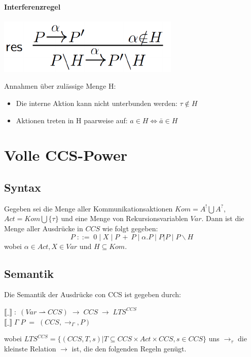 \documentclass[a4paper,10pt, oneside]{book}
\begin{document}
\paragraph{Interferenzregel}
\begin{center}
 \includegraphics[scale=0.6]{res_regel}
\end{center}

Annahmen über zulässige Menge H:
\begin{itemize}
 \item Die interne Aktion kann nicht unterbunden werden: $\tau \notin H$
 \item Aktionen treten in H paarweise auf: $a \in H \Longleftrightarrow \bar{a} \in H$
\end{itemize}

\section{Volle CCS-Power}
\subsection{Syntax}
Gegeben sei die Menge aller Kommunikationsaktionen $Kom = A^! \bigcup A^?$, $Act = Kom \bigcup \{ \tau \}$ und eine Menge von Rekursionsvariablen $Var$. Dann ist die Menge aller Ausdrücke in $CCS$ wie folgt gegeben: \\
\begin{equation*}
 P \; ::= \; 0 \; | \; X \; | \; P \: + \: P \; | \; \alpha.P \; | \; P|P \; | \; P\backslash H
\end{equation*}
wobei $\alpha \in Act, X \in Var$ und $H \subseteq Kom$.

\subsection{Semantik}
Die Semantik der Ausdrücke con CCS ist gegeben durch:\\
\begin{center}
 $\llbracket\_\rrbracket \; : \; (Var \rightharpoonup CCS) \; \rightarrow \; CCS \; \rightarrow \;  LTS^{CCS}$\\
 $\llbracket\_\rrbracket \; \Gamma \; P \; = \; (CCS, \rightarrow_{\Gamma}, P)$
\end{center}
wobei $LTS^{CCS} = \{(CCS, T, s) | T \subseteq CCS \times Act \times CCS, s \in CCS\}$ uns $\rightarrow_{\tau}$ die kleinste Relation $\rightarrow$ ist, die den folgenden Regeln genügt.
\end{document}
